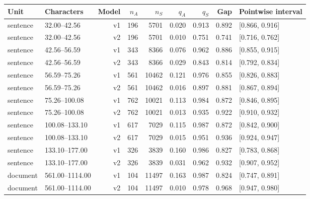 \begin{tabular}{llrrrrrrl}
\toprule
Unit & Characters & Model & $n_A$ & $n_S$ & $q_A$ & $q_S$ & Gap & Pointwise interval \\
\midrule
sentence & 32.00--42.56 & v1 & 196 & 5701 & 0.020 & 0.913 & 0.892 & [0.866, 0.916] \\
sentence & 32.00--42.56 & v2 & 196 & 5701 & 0.010 & 0.751 & 0.741 & [0.716, 0.762] \\
sentence & 42.56--56.59 & v1 & 343 & 8366 & 0.076 & 0.962 & 0.886 & [0.855, 0.915] \\
sentence & 42.56--56.59 & v2 & 343 & 8366 & 0.029 & 0.843 & 0.814 & [0.792, 0.834] \\
sentence & 56.59--75.26 & v1 & 561 & 10462 & 0.121 & 0.976 & 0.855 & [0.826, 0.883] \\
sentence & 56.59--75.26 & v2 & 561 & 10462 & 0.016 & 0.897 & 0.881 & [0.867, 0.894] \\
sentence & 75.26--100.08 & v1 & 762 & 10021 & 0.113 & 0.984 & 0.872 & [0.846, 0.895] \\
sentence & 75.26--100.08 & v2 & 762 & 10021 & 0.013 & 0.935 & 0.922 & [0.910, 0.932] \\
sentence & 100.08--133.10 & v1 & 617 & 7029 & 0.115 & 0.987 & 0.872 & [0.842, 0.900] \\
sentence & 100.08--133.10 & v2 & 617 & 7029 & 0.015 & 0.951 & 0.936 & [0.924, 0.947] \\
sentence & 133.10--177.00 & v1 & 326 & 3839 & 0.160 & 0.986 & 0.827 & [0.783, 0.868] \\
sentence & 133.10--177.00 & v2 & 326 & 3839 & 0.031 & 0.962 & 0.932 & [0.907, 0.952] \\
document & 561.00--1114.00 & v1 & 104 & 11497 & 0.163 & 0.987 & 0.824 & [0.747, 0.891] \\
document & 561.00--1114.00 & v2 & 104 & 11497 & 0.010 & 0.978 & 0.968 & [0.947, 0.980] \\
\bottomrule
\end{tabular}
